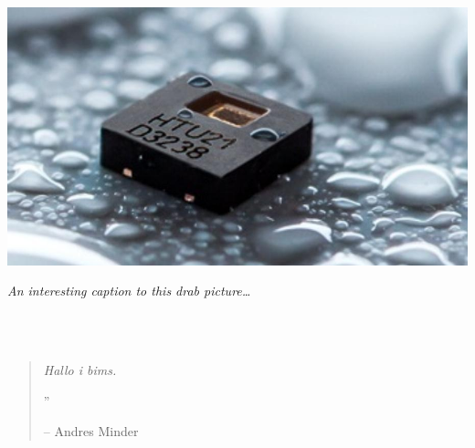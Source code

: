 
\begin{multicols}{3}

\blindtext \\

\end{multicols} 

\begin{center}
\vspace{10pt}
\includegraphics[width=0.8\linewidth]{graphics/placeholder.jpg} 
\par\large\textit{An interesting caption to this drab picture\ldots}
\vspace{10pt}
\end{center}


\begin{multicols}{3} 
\blindtext \\ \\

\begin{quotation} 

\noindent\normalsize\textit{Hallo i bims.}

\hfill{\Huge''}

\hfill-- Andres Minder

\end{quotation}
\end{multicols}